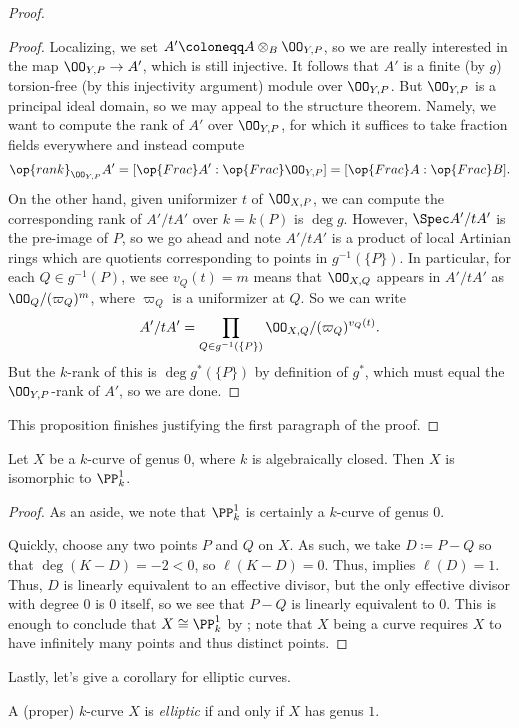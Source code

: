 \documentclass[../notes.tex]{subfiles}
\begin{document}
\begin{proof}
\begin{proof}
		Localizing, we set $A'\coloneqq A\otimes_B\OO_{Y,P}$, so we are really interested in the map $\OO_{Y,P}\to A'$, which is still injective. It follows that $A'$ is a finite (by $g$) torsion-free (by this injectivity argument) module over $\OO_{Y,P}$. But $\OO_{Y,P}$ is a principal ideal domain, so we may appeal to the structure theorem. Namely, we want to compute the rank of $A'$ over $\OO_{Y,P}$, for which it suffices to take fraction fields everywhere and instead compute
		\[\op{rank}_{\OO_{Y,P}}A'=[\op{Frac}A':\op{Frac}\OO_{Y,P}]=[\op{Frac}A:\op{Frac}B].\]
		On the other hand, given uniformizer $t$ of $\OO_{X,P}$, we can compute the corresponding rank of $A'/tA'$ over $k=k(P)$ is $\deg g$. However, $\Spec A'/tA'$ is the pre-image of $P$, so we go ahead and note $A'/tA'$ is a product of local Artinian rings which are quotients corresponding to points in $g^{-1}(\{P\})$. In particular, for each $Q\in g^{-1}(P)$, we see $v_Q(t)=m$ means that $\OO_{X,Q}$ appears in $A'/tA'$ as $\OO_Q/(\varpi_Q)^{m}$, where $\varpi_Q$ is a uniformizer at $Q$. So we can write
		\[A'/tA'=\prod_{Q\in g^{-1}(\{P\})}\OO_{X,Q}/(\varpi_Q)^{v_Q(t)}.\]
		But the $k$-rank of this is $\deg g^*(\{P\})$ by definition of $g^*$, which must equal the $\OO_{Y,P}$-rank of $A'$, so we are done.
	\end{proof}
	This proposition finishes justifying the first paragraph of the proof.
\end{proof}
\begin{corollary}
	Let $X$ be a $k$-curve of genus $0$, where $k$ is algebraically closed. Then $X$ is isomorphic to $\PP^1_k$.
\end{corollary}
\begin{proof}
	As an aside, we note that $\PP^1_k$ is certainly a $k$-curve of genus $0$.

	Quickly, choose any two points $P$ and $Q$ on $X$. As such, we take $D\coloneqq P-Q$ so that $\deg(K-D)=-2<0$, so $\ell(K-D)=0$. Thus,  implies $\ell(D)=1$. Thus, $D$ is linearly equivalent to an effective divisor, but the only effective divisor with degree $0$ is $0$ itself, so we see that $P-Q$ is linearly equivalent to $0$. This is enough to conclude that $X\cong\PP^1_k$ by ; note that $X$ being a curve requires $X$ to have infinitely many points and thus distinct points.
\end{proof}
Lastly, let's give a corollary for elliptic curves.
\begin{definition}[elliptic]
	A (proper) $k$-curve $X$ is \textit{elliptic} if and only if $X$ has genus $1$.
\end{definition}
\end{document}
